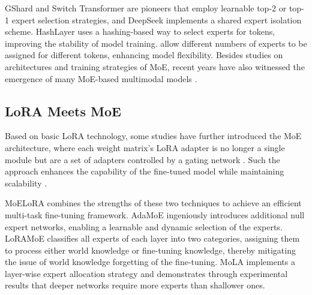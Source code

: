 GShard \cite{lepikhin2020gshard} and Switch Transformer \cite{fedus2022switch} are pioneers that employ learnable top-2 or top-1 expert selection strategies, and DeepSeek \cite{dai2024deepseekmoe} implements a shared expert isolation scheme. HashLayer \cite{roller2021hash} uses a hashing-based way to select experts for tokens, improving the stability of model training. \cite{huang2024harder,zhou2022mixture,yang2024xmoe} allow different numbers of experts to be assigned for different tokens, enhancing model flexibility. Besides studies on architectures and training strategies of MoE, recent years have also witnessed the emergence of many MoE-based multimodal models \cite{riquelme2021scaling,mustafa2022multimodal,du2022glam}.

\subsection{LoRA Meets MoE}
Based on basic LoRA technology, some studies have further introduced the MoE architecture, where each weight matrix's LoRA adapter is no longer a single module but are a set of adapters controlled by a gating network \cite{yang2024moral,wu2024parameter}. Such the approach enhances the capability of the fine-tuned model while maintaining scalability \cite{li2024mixlora,wumixture}. 

MoELoRA \cite{liu2024moe} combines the strengths of these two techniques to achieve an efficient multi-task fine-tuning framework. 
AdaMoE \cite{zeng2024adamoe} ingeniously introduces additional null expert networks, enabling a learnable and dynamic selection of the experts. 
LoRAMoE \cite{dou2024loramoe} classifies all experts of each layer into two categories, assigning them to process either world knowledge or fine-tuning knowledge, thereby mitigating the issue of world knowledge forgetting of the fine-tuning. 
MoLA \cite{gao2024higher} implements a layer-wise expert allocation strategy and demonstrates through experimental results that deeper networks require more experts than shallower ones.

